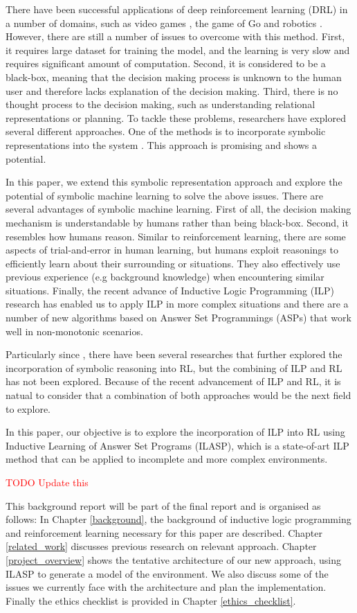 There have been successful applications of deep reinforcement learning (DRL) in a number of domains, such as video games \cite{Mnih2015}, the game of Go \cite{Silver2016} and robotics \cite{Levine2015}. However, there are still a number of issues to overcome with this method.
First, it requires large dataset for training the model, and the learning is very slow and requires significant amount of computation.
Second, it is considered to be a black-box, meaning that the decision making process is unknown to the human user and therefore lacks explanation of the decision making. Third, there is no thought process to the decision making, such as understanding relational representations or planning. To tackle these problems, researchers have explored several different approaches.
One of the methods is to incorporate symbolic representations into the system \cite{Garnelo2016}. This approach is promising and shows a potential.

In this paper, we extend this symbolic representation approach and explore the potential of symbolic machine learning to solve the above issues. There are several advantages of symbolic machine learning. First of all, the decision making mechanism is understandable by humans rather than being black-box.
Second, it resembles how humans reason. Similar to reinforcement learning, there are some aspects of trial-and-error in human learning, but humans exploit reasonings to efficiently learn about their surrounding or situations. They also effectively use previous experience (e.g background knowledge) when encountering similar situations.
Finally, the recent advance of Inductive Logic Programming (ILP) research has enabled us to apply ILP in more complex situations and there are a number of new algorithms based on Answer Set Programmings (ASPs) that work well in non-monotonic scenarios.

Particularly since \cite{Garnelo2016}, there have been several researches that further explored the incorporation of symbolic reasoning into RL, but the combining of ILP and RL has not been explored. Because of the recent advancement of ILP and RL, it is natual to consider that a combination of both approaches would be the next field to explore.

In this paper, our objective is to  explore the incorporation of ILP into RL using Inductive Learning of Answer Set Programs (ILASP), which is a state-of-art ILP method that can be applied to incomplete and more complex environments.

\textcolor{red}{TODO Update this}

This background report will be part of the final report and is organised as follows: 
In Chapter \ref{background}, the background of inductive logic programming and reinforcement learning necessary for this paper are described. 
Chapter \ref{related_work} discusses previous research on relevant approach. 
Chapter \ref{project_overview} shows the tentative architecture of our new approach, using ILASP to generate a model of the environment. 
We also discuss some of the issues we currently face with the architecture and plan the implementation. 
Finally the ethics checklist is provided in Chapter \ref{ethics_checklist}.
